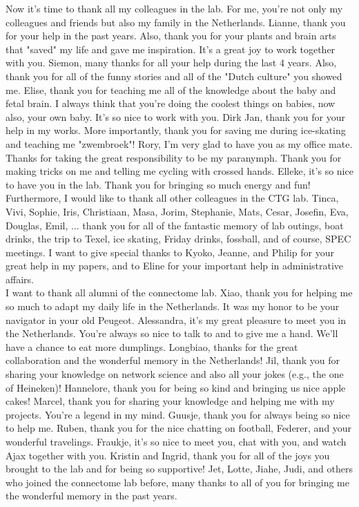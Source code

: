 \noindent
Now it's time to thank all my colleagues in the lab. For me, you're not only my colleagues and friends but also my family in the Netherlands. Lianne, thank you for your help in the past years. Also, thank you for your plants and brain arts that "saved" my life and gave me inspiration. It's a great joy to work together with you. Siemon, many thanks for all your help during the last 4 years. Also, thank you for all of the funny stories and all of the "Dutch culture" you showed me. Elise, thank you for teaching me all of the knowledge about the baby and fetal brain. I always think that you're doing the coolest things on babies, now also, your own baby. It's so nice to work with you. Dirk Jan, thank you for your help in my works. More importantly, thank you for saving me during ice-skating and teaching me "zwembroek"! Rory, I'm very glad to have you as my office mate. Thanks for taking the great responsibility to be my paranymph. Thank you for making tricks on me and telling me cycling with crossed hands. Elleke, it's so nice to have you in the lab. Thank you for bringing so much energy and fun! Furthermore, I would like to thank all other colleagues in the CTG lab. Tinca, Vivi, Sophie, Iris, Christiaan, Masa, Jorim, Stephanie, Mats, Cesar, Josefin, Eva, Douglas, Emil, ... thank you for all of the fantastic memory of lab outings, boat drinks, the trip to Texel, ice skating, Friday drinks, fossball, and of course, SPEC meetings. I want to give special thanks to Kyoko, Jeanne, and Philip for your great help in my papers, and to Eline for your important help in administrative affairs.\\

\noindent
I want to thank all alumni of the connectome lab. Xiao, thank you for helping me so much to adapt my daily life in the Netherlands. It was my honor to be your navigator in your old Peugeot. Alessandra, it's my great pleasure to meet you in the Netherlands. You're always so nice to talk to and to give me a hand. We'll have a chance to eat more dumplings. Longbiao, thanks for the great collaboration and the wonderful memory in the Netherlands! Jil, thank you for sharing your knowledge on network science and also all your jokes (e.g., the one of Heineken)! Hannelore, thank you for being so kind and bringing us nice apple cakes! Marcel, thank you for sharing your knowledge and helping me with my projects. You're a legend in my mind. Guusje, thank you for always being so nice to help me. Ruben, thank you for the nice chatting on football, Federer, and your wonderful travelings. Fraukje, it's so nice to meet you, chat with you, and watch Ajax together with you. Kristin and Ingrid, thank you for all of the joys you brought to the lab and for being so supportive! Jet, Lotte, Jiahe, Judi, and others who joined the connectome lab before, many thanks to all of you for bringing me the wonderful memory in the past years.\\

